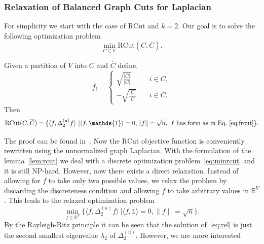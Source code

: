 \subsubsection*{Relaxation of Balanced Graph Cuts for Laplacian}%
For simplicity we start with the case of $\mathrm{RCut}$ and $k=2$. Our goal is to solve the following optimization problem
\begin{equation}
\label{eq:minrcut}
\min\limits_{C \in V} \mathrm{RCut}(C,\overline{C}).
\end{equation} 
\begin{lemma}
\label{lem:rcut}
Given a partition of $V$ into $C$ and $\overline{C}$ define,
\begin{equation}
\label{eq:frcut}
 f_i = \begin{cases} 
                      \sqrt{\frac{\lvert \overline{C} \rvert}{\lvert C \rvert}}   & \quad i \in C, \\
                      - \sqrt{\frac{\lvert C \rvert}{\lvert \overline{C} \rvert}} & \quad i \in \overline{C}.
                     \end{cases}
\end{equation}
Then 
\begin{equation*}
\mathrm{RCut}(C,\overline{C}) = \{\langle f, \Delta_{2}^{(u)} f \rangle\ |\langle f, \mathds{1} \rangle=0, \lVert f \rVert = \sqrt{n}, \text{ $f$  has form as in Eq.~\eqref{eq:frcut}} \}.
\end{equation*}
\end{lemma}
The proof can be found in~\cite{Luxb07}. 
Now the $\mathrm{RCut}$ objective function is conveniently rewritten using the unnormalized graph Laplacian. With the formulation of the lemma~\eqref{lem:rcut} we deal with a discrete optimization problem~\eqref{eq:minrcut} and 
it is still NP-hard.
However, now there exists a direct relaxation. Instead of allowing for $f$ to take only two possible values, we relax the problem by discarding the discreteness condition and allowing $f$ to take arbitrary values in $\mathbb{R}^V$. 
This leads to the relaxed optimization problem
\begin{equation}
\label{eq:rel}
\min \limits_{f \in \mathbb{R}^V} \{\langle f, \Delta_{2}^{(u)} f \rangle\ |\langle f, \mathds{1} \rangle=0, \lVert f \rVert = \sqrt{n}\}.
\end{equation}
By the Rayleigh-Ritz principle it can be seen that the solution of~\eqref{eq:rel} is just the second smallest eigenvalue $\lambda_2$ of $\Delta_{2}^{(u)}$. However, we are more interested
